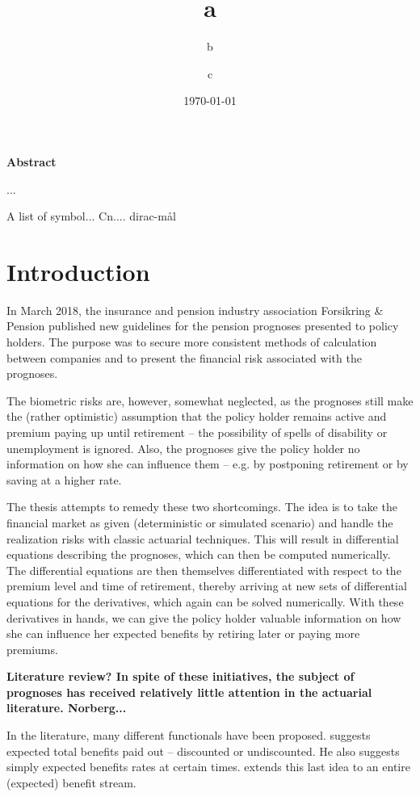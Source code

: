 \documentclass{book}
\title{a}
\subtitle{b}
\author{c}
\date{\today}
\newcommand{\1}[1]{\mathbbm{1}_{\left\lbrace #1 \right\rbrace}}
\theoremstyle{break}
\theoremstyle{remark}
\numberwithin{equation}{section}
\begin{document}
\maketitle

\textbf{Abstract}

...

\newpage

\tableofcontents

\newpage

A list of symbol... Cn.... dirac-mål

\chapter{Introduction}

In March 2018, the insurance and pension industry association Forsikring \& Pension published new guidelines for the pension prognoses presented to policy holders. The purpose was to secure more consistent methods of calculation between companies and to present the financial risk associated with the prognoses.

The biometric risks are, however, somewhat neglected, as the prognoses still make the (rather optimistic) assumption that the policy holder remains active and premium paying up until retirement -- the possibility of spells of disability or unemployment is ignored. Also, the prognoses give the policy holder no information on how she can influence them -- e.g. by postponing retirement or by saving at a higher rate.

The thesis attempts to remedy these two shortcomings. The idea is to take the financial market as given (deterministic or simulated scenario) and handle the realization risks with classic actuarial techniques. This will result in differential equations describing the prognoses, which can then be computed numerically. The differential equations are then themselves differentiated with respect to the premium level and time of retirement, thereby arriving at new sets of differential equations for the derivatives, which again can be solved numerically. With these derivatives in hands, we can give the policy holder valuable information on how she can influence her expected benefits by retiring later or paying more premiums.

\textbf{Literature review? In spite of these initiatives, the subject of prognoses has received relatively little attention in the actuarial literature. Norberg...}

In the literature, many different functionals have been proposed. \cite{Norberg2001} suggests expected total benefits paid out -- discounted or undiscounted. He also suggests simply expected benefits rates at certain times. \cite{NinnaReitzel} extends this last idea to an entire (expected) benefit stream.
\end{document}
